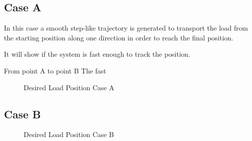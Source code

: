 
\subsection{Case A}
In this case a smooth step-like trajectory is generated to transport the load from the starting position along one direction in order to reach the final position. 

It will show if the system is fast enough to track the position.

From point A to point B
The fast

\begin{figure}[h!]
	\centering
	\caption{Desired Load Position Case A\label{fig:set.caseA}}
\end{figure}		


\subsection{Case B}

\begin{figure}[h!]
	\centering
	\caption{Desired Load Position Case B\label{fig:set.caseB}}
\end{figure}		


